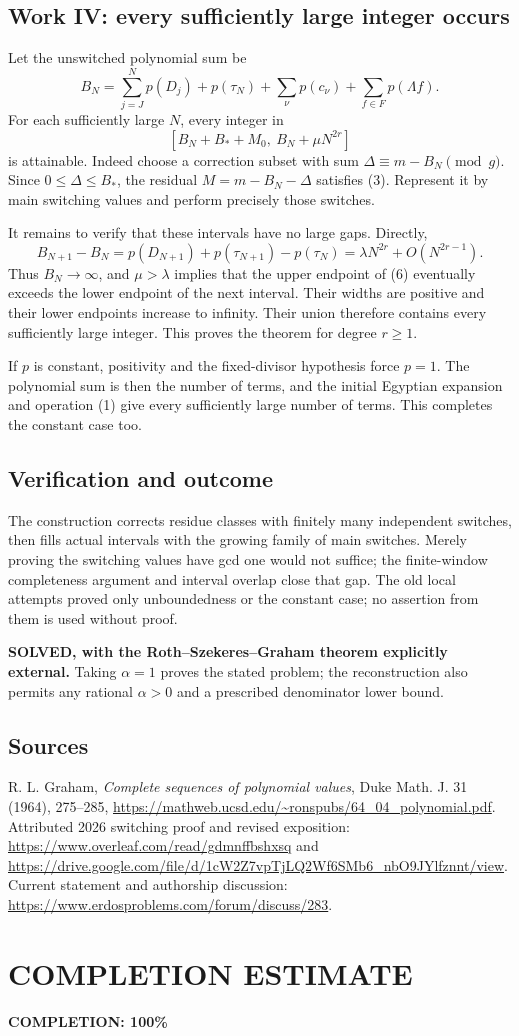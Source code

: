 \subsection{Work IV: every sufficiently large integer occurs}
Let the unswitched polynomial sum be
\[
 B_N=\sum_{j=J}^{N}p(D_j)+p(\tau_N)
                 +\sum_\nu p(c_\nu)+\sum_{f\in F}p(\Lambda f).
\]
For each sufficiently large $N$, every integer in
\[
 [B_N+B_*+M_0,\ B_N+\mu N^{2r}]
 \tag{6}
\]
is attainable. Indeed choose a correction subset with sum $\Delta\equiv m-B_N\pmod g$. Since $0\le\Delta\le B_*$, the residual $M=m-B_N-\Delta$ satisfies (3). Represent it by main switching values and perform precisely those switches.

It remains to verify that these intervals have no large gaps. Directly,
\[
 B_{N+1}-B_N=p(D_{N+1})+p(\tau_{N+1})-p(\tau_N)
             =\lambda N^{2r}+O(N^{2r-1}).
\]
Thus $B_N\to\infty$, and $\mu>\lambda$ implies that the upper endpoint of (6) eventually exceeds the lower endpoint of the next interval. Their widths are positive and their lower endpoints increase to infinity. Their union therefore contains every sufficiently large integer. This proves the theorem for degree $r\ge1$.

If $p$ is constant, positivity and the fixed-divisor hypothesis force $p=1$. The polynomial sum is then the number of terms, and the initial Egyptian expansion and operation (1) give every sufficiently large number of terms. This completes the constant case too.

\subsection{Verification and outcome}
The construction corrects residue classes with finitely many independent switches, then fills actual intervals with the growing family of main switches. Merely proving the switching values have gcd one would not suffice; the finite-window completeness argument and interval overlap close that gap. The old local attempts proved only unboundedness or the constant case; no assertion from them is used without proof.

\textbf{SOLVED, with the Roth--Szekeres--Graham theorem explicitly external.} Taking $\alpha=1$ proves the stated problem; the reconstruction also permits any rational $\alpha>0$ and a prescribed denominator lower bound.

\subsection{Sources}
R. L. Graham, \emph{Complete sequences of polynomial values}, Duke Math. J. 31 (1964), 275--285, \url{https://mathweb.ucsd.edu/~ronspubs/64_04_polynomial.pdf}. Attributed 2026 switching proof and revised exposition: \url{https://www.overleaf.com/read/gdmnffbshxsq} and \url{https://drive.google.com/file/d/1cW2Z7vpTjLQ2Wf6SMb6_nbO9JYlfznnt/view}. Current statement and authorship discussion: \url{https://www.erdosproblems.com/forum/discuss/283}.
\section{COMPLETION ESTIMATE}
\textbf{COMPLETION: 100\%}
